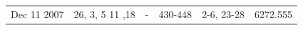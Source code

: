 \documentclass[a4paper,12pt]{article}
\begin{document}
\begin{table}
\begin{tabular}{rrrrrr}
                                                                                                                                                                                                                                                                                                                                                                                                                                                                                                                                             Dec 11 2007 & 26, 3, 5 11 ,18 & -     & 430-448 & 2-6, 23-28 & 6272.555 \\
                                                                                                                                                                                                                                                                                                                                                                                                                                                                                                                                                                                                                                                                                                                                                                                                                                                                                                                                                                                                                                                                                                                                                                                                                                                                                                                                                                                                                                                                                                                                                                                                                                                                                                                                                                                                                                                                                                                                                                                                                                                                                                                                                                                                                                                                                                                                                                                                                                                                                                                                                                                                                                                                                                                            
\end{tabular}
\end{table}
\end{document}
